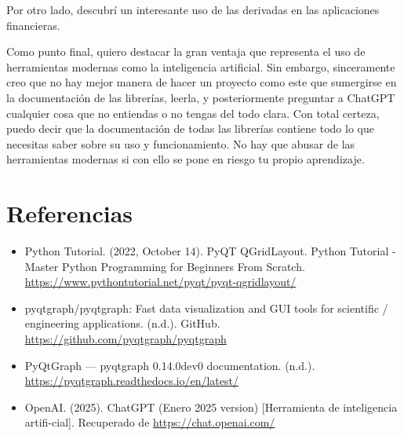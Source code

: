 \documentclass{article}
\begin{document}
Por otro lado, descubrí un interesante uso de las derivadas en las aplicaciones financieras.

Como punto final, quiero destacar la gran ventaja que representa el uso de herramientas modernas como la inteligencia artificial. Sin embargo, sinceramente creo que no hay mejor manera de hacer un proyecto como este que sumergirse en la documentación de las librerías, leerla, y posteriormente preguntar a ChatGPT cualquier cosa que no entiendas o no tengas del todo clara. Con total certeza, puedo decir que la documentación de todas las librerías contiene todo lo que necesitas saber sobre su uso y funcionamiento. No hay que abusar de las herramientas modernas si con ello se pone en riesgo tu propio aprendizaje. 

\section{Referencias}
\begin{itemize}
    \item Python Tutorial. (2022, October 14). PyQT QGridLayout. Python Tutorial - Master Python Programming for Beginners From Scratch. 
        \url{https://www.pythontutorial.net/pyqt/pyqt-qgridlayout/}
    \item pyqtgraph/pyqtgraph: Fast data visualization and GUI tools for scientific / engineering applications. (n.d.). GitHub.                    
        \url{https://github.com/pyqtgraph/pyqtgraph}
    \item PyQtGraph — pyqtgraph 0.14.0dev0 documentation. (n.d.).                 \url{https://pyqtgraph.readthedocs.io/en/latest/}
    \item OpenAI. (2025). ChatGPT (Enero 2025 version) [Herramienta de inteligencia artifi-cial]. Recuperado de 
        \url{https://chat.openai.com/}
        
\end{itemize}
\end{document}
